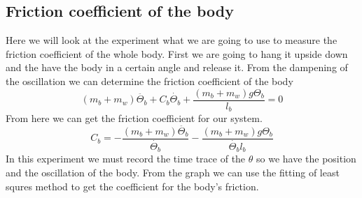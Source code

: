 


\subsection{Friction coefficient of the body}
Here we will look at the experiment what we are going to use to measure the friction coefficient of the whole body.
First we are going to hang it upside down and the have the body in a certain angle and release it.
From the dampening of the oscillation we can determine the friction coefficient of the body
\begin{equation}
	\label{eq:Motion equation for the pendulum}
	(m_{b}+m_{w})\ddot{\Theta_{b}}+C_{b}\dot{\Theta_{b}}+\frac{(m_{b}+m_{w})g\Theta_{b}}{l_{b}}=0
\end{equation}
From here we can get the friction coefficient for our system.
\begin{equation}
	\label{eq:motion equation for friction}
	C_{b}=-\frac{(m_{b}+m_{w})\ddot{\Theta_{b}}}{\dot{\Theta_{b}}}-\frac{(m_{b}+m_{w})g\Theta_{b}}{\dot{\Theta_{b}}l_{b}}
\end{equation}
In this experiment we must record the time trace of the $\theta$ so we have the position and the oscillation of the body.
From the graph we can use the fitting of least squres method to get the coefficient for the body's friction.

















